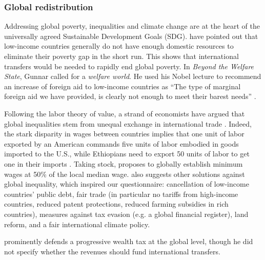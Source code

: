 \subsubsection{Global redistribution}\label{subsubsec:literature_redistribution}
Addressing global poverty, inequalities and climate change are at the heart of the universally agreed Sustainable Development Goals (SDG). %
\citet{bolch_arithmetics_2022} have pointed out that low-income countries generally do not have enough domestic resources to eliminate their poverty gap in the short run. %
This shows that international transfers would be needed to rapidly end global poverty. 
In \textit{Beyond the Welfare State}, Gunnar \citet{myrdal_beyond_1960} called for a \textit{welfare world}. He used his Nobel lecture to recommend an increase of foreign aid to low-income countries as ``The type of marginal foreign aid we have provided, is clearly not enough to meet their barest needs'' \citep{myrdal_equality_1975}.

Following the labor theory of value, a strand of economists have argued that global inequalities stem from unequal exchange in international trade \citep{arghiri_unequal_1972}. Indeed, the stark disparity in wages between countries implies that one unit of labor exported by an American commands five units of labor embodied in goods imported to the U.S., while Ethiopians need to export 50 units of labor to get one in their imports \citep{alsamawi_employment_2014,reyes_better_2017}.
Taking stock, \citet{hickel_divide_2017} proposes to globally establish minimum wages at 50\% of the local median wage. \citet{hickel_divide_2017} also suggests other solutions against global inequality, which inspired our questionnaire: cancellation of low-income countries' public debt, fair trade (in particular no tariffs from high-income countries, reduced patent protections, reduced farming subsidies in rich countries), measures against tax evasion (e.g. a global financial register), land reform, and a fair international climate policy. 

\citet{piketty_capital_2014} prominently defends a progressive wealth tax at the global level, though he did not specify whether the revenues should fund international transfers. %

